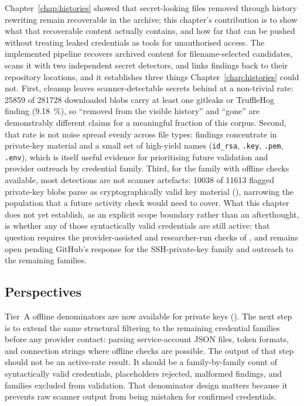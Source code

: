 Chapter~\ref{chap:histories} showed that secret-looking files removed through history rewriting remain recoverable in the archive; this chapter's contribution is to show what that recoverable content actually contains, and how far that can be pushed without treating leaked credentials as tools for unauthorised access.
The implemented pipeline recovers archived content for filename-selected candidates, scans it with two independent secret detectors, and links findings back to their repository locations, and it establishes three things Chapter~\ref{chap:histories} could not.
First, cleanup leaves scanner-detectable secrets behind at a non-trivial rate: \num{25859} of \num{281728} downloaded blobs carry at least one gitleaks or TruffleHog finding (\SI{9.18}{\percent}), so ``removed from the visible history'' and ``gone'' are demonstrably different claims for a meaningful fraction of this corpus.
Second, that rate is not noise spread evenly across file types: findings concentrate in private-key material and a small set of high-yield names (\texttt{id\_rsa}, \texttt{.key}, \texttt{.pem}, \texttt{.env}), which is itself useful evidence for prioritising future validation and provider outreach by credential family.
Third, for the family with offline checks available, most detections are not scanner artefacts: \num{10038} of \num{11613} flagged private-key blobs parse as cryptographically valid key material (), narrowing the population that a future activity check would need to cover.
What this chapter does not yet establish, as an explicit scope boundary rather than an afterthought, is whether any of those syntactically valid credentials are still active: that question requires the provider-assisted and researcher-run checks of , and remains open pending GitHub's response for the SSH-private-key family and outreach to the remaining families.

\subsection{Perspectives}

Tier~A offline denominators are now available for private keys ().
The next step is to extend the same structural filtering to the remaining credential families before any provider contact: parsing service-account JSON files, token formats, and connection strings where offline checks are possible.
The output of that step should not be an active-rate result.
It should be a family-by-family count of syntactically valid credentials, placeholders rejected, malformed findings, and families excluded from validation.
That denominator design matters because it prevents raw scanner output from being mistaken for confirmed credentials.

